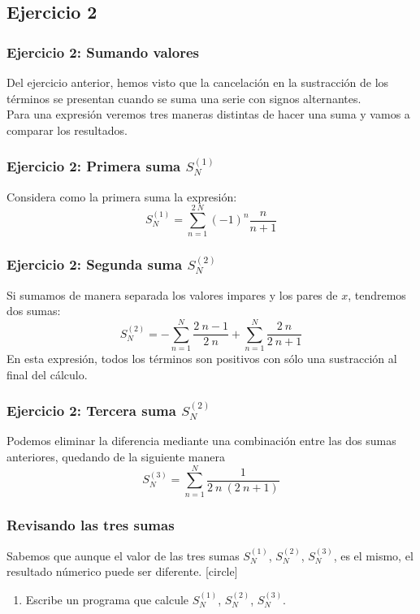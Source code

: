 \subsection{Ejercicio 2}
\begin{frame}
\frametitle{Ejercicio 2: Sumando valores}
Del ejercicio anterior, hemos visto que la cancelación en la sustracción de los términos se presentan cuando se suma una serie con signos alternantes.
\\
\bigskip
\pause
Para una expresión veremos tres maneras distintas de hacer una suma y vamos a comparar los resultados.
\end{frame}
\begin{frame}
\frametitle{Ejercicio 2: Primera suma $S^{(1)}_{N}$}
Considera como la primera suma la expresión:
\begin{equation}
S^{(1)}_{N}= \sum^{2 \: N}_{n=1} (-1)^{n} \dfrac{n}{n + 1}
\label{eq:ecuacion_02_10}
\end{equation}
\end{frame}
\begin{frame}
\frametitle{Ejercicio 2: Segunda suma $S^{(2)}_{N}$}
Si sumamos de manera separada los valores impares y los pares de $x$, tendremos dos sumas:
\begin{equation}
S^{(2)}_{N}= - \sum^{N}_{n = 1} \dfrac{2 \: n-1}{2 \: n} + \sum^{N}_{n = 1} \dfrac{2 \: n}{2 \: n + 1}
\label{eq:ecuacion_02_11}
\end{equation}
En esta expresión, todos los términos son positivos con sólo una sustracción al final del cálculo.
\end{frame}
\begin{frame}
\frametitle{Ejercicio 2: Tercera suma $S^{(2)}_{N}$}
Podemos eliminar la diferencia mediante una combinación entre las dos sumas anteriores, quedando de la siguiente manera
\begin{equation}
S^{(3)}_{N}=  \sum^{N}_{n = 1} \dfrac{1}{2 \: n \: (2 \: n + 1)}
\label{eq:ecuacion_02_12}
\end{equation}
\end{frame}
\begin{frame}
\frametitle{Revisando las tres sumas}
Sabemos que aunque el valor de las tres sumas $S^{(1)}_{N}$, $S^{(2)}_{N}$, $S^{(3)}_{N}$, es el mismo, el resultado númerico puede ser diferente.
[circle]
\begin{enumerate}[<+->]
\item Escribe un programa que calcule $S^{(1)}_{N}$, $S^{(2)}_{N}$, $S^{(3)}_{N}$.
\seti
\end{enumerate}
\end{frame}
